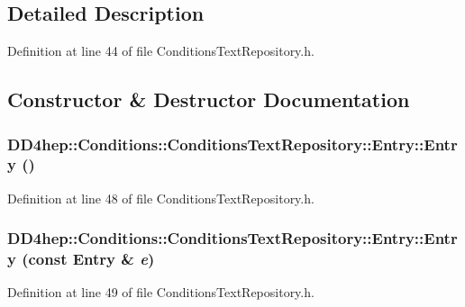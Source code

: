 \subsection{Detailed Description}


Definition at line 44 of file ConditionsTextRepository.h.

\subsection{Constructor \& Destructor Documentation}
\hypertarget{class_d_d4hep_1_1_conditions_1_1_conditions_text_repository_1_1_entry_a9146bcb872abe9741774c1c6b967fac7}{
\subsubsection[{Entry}]{\setlength{\rightskip}{0pt plus 5cm}DD4hep::Conditions::ConditionsTextRepository::Entry::Entry ()}}
\label{class_d_d4hep_1_1_conditions_1_1_conditions_text_repository_1_1_entry_a9146bcb872abe9741774c1c6b967fac7}


Definition at line 48 of file ConditionsTextRepository.h.\hypertarget{class_d_d4hep_1_1_conditions_1_1_conditions_text_repository_1_1_entry_afe8a21e97ecbe0686508a5bf5b847f43}{
\subsubsection[{Entry}]{\setlength{\rightskip}{0pt plus 5cm}DD4hep::Conditions::ConditionsTextRepository::Entry::Entry (const {\bf Entry} \& {\em e})}}
\label{class_d_d4hep_1_1_conditions_1_1_conditions_text_repository_1_1_entry_afe8a21e97ecbe0686508a5bf5b847f43}


Definition at line 49 of file ConditionsTextRepository.h.

